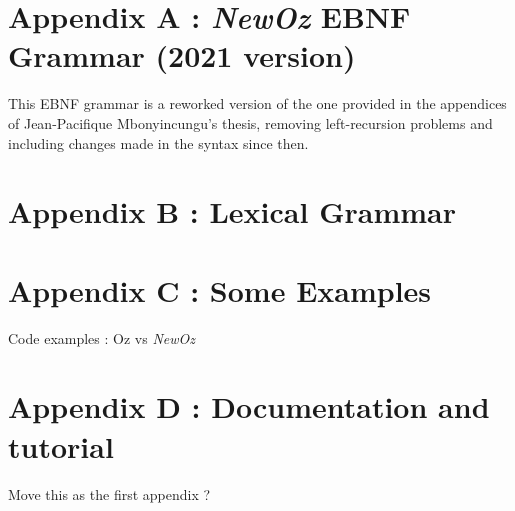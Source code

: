 
\section*{Appendix A : \textit{NewOz} EBNF Grammar (2021 version)}\label{sec:appendix-grammar}
This EBNF grammar is a reworked version of the one provided in the appendices of Jean-Pacifique Mbonyincungu's thesis,
removing left-recursion problems and including changes made in the syntax since then.


\section*{Appendix B : Lexical Grammar}\label{sec:appendix-lexical-grammar}


\section*{Appendix C : Some Examples}\label{sec:appendix-examples}
Code examples : Oz vs \textit{NewOz}

\section*{Appendix D : Documentation and tutorial}\label{sec:appendix-doc}
Move this as the first appendix ?